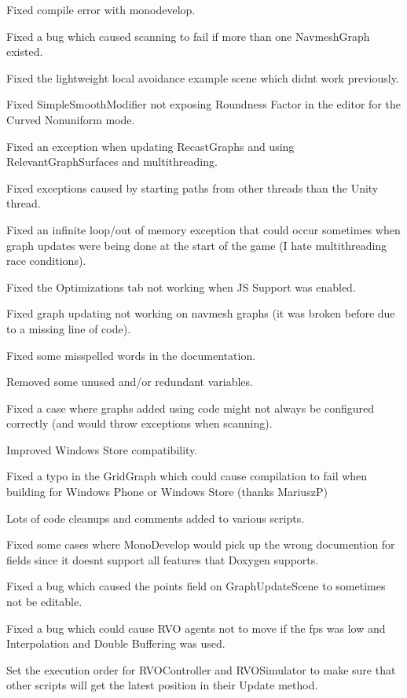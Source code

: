 \begin{DoxyItemize}
\begin{DoxyItemize}
\begin{DoxyItemize}
\item Fixed compile error with monodevelop.
\item Fixed a bug which caused scanning to fail if more than one Navmesh\+Graph existed.
\item Fixed the lightweight local avoidance example scene which didn\textquotesingle{}t work previously.
\item Fixed Simple\+Smooth\+Modifier not exposing Roundness Factor in the editor for the Curved Nonuniform mode.
\item Fixed an exception when updating Recast\+Graphs and using Relevant\+Graph\+Surfaces and multithreading.
\item Fixed exceptions caused by starting paths from other threads than the Unity thread.
\item Fixed an infinite loop/out of memory exception that could occur sometimes when graph updates were being done at the start of the game (I hate multithreading race conditions).
\item Fixed the Optimizations tab not working when JS Support was enabled.
\item Fixed graph updating not working on navmesh graphs (it was broken before due to a missing line of code).
\item Fixed some misspelled words in the documentation.
\item Removed some unused and/or redundant variables.
\item Fixed a case where graphs added using code might not always be configured correctly (and would throw exceptions when scanning).
\item Improved Windows Store compatibility.
\item Fixed a typo in the Grid\+Graph which could cause compilation to fail when building for Windows Phone or Windows Store (thanks MariuszP)
\item Lots of code cleanups and comments added to various scripts.
\item Fixed some cases where Mono\+Develop would pick up the wrong documention for fields since it doesn\textquotesingle{}t support all features that Doxygen supports.
\item Fixed a bug which caused the points field on Graph\+Update\+Scene to sometimes not be editable.
\item Fixed a bug which could cause R\+VO agents not to move if the fps was low and Interpolation and Double Buffering was used.
\item Set the execution order for R\+V\+O\+Controller and R\+V\+O\+Simulator to make sure that other scripts will get the latest position in their Update method.

\end{DoxyItemize}
\end{DoxyItemize}
\end{DoxyItemize}
